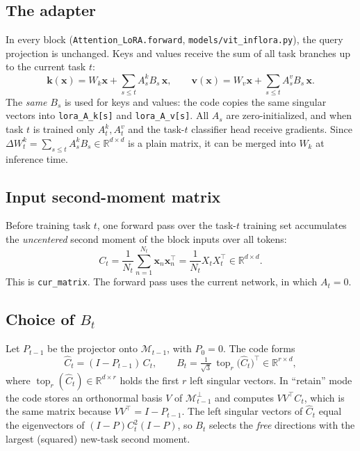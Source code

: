 \documentclass[11pt]{article}
\theoremstyle{plain}
\theoremstyle{definition}
\theoremstyle{remark}
\newcommand{\R}{\mathbb{R}}
\newcommand{\M}{\mathcal{M}}
\newcommand{\topr}{\operatorname{top}_r}
\newcommand{\x}{\bm{x}}
\newcommand{\code}[1]{\texttt{#1}}
\begin{document}
\subsection{The adapter}
In every block (\code{Attention\_LoRA.forward}, \code{models/vit\_inflora.py}), the query projection is unchanged. Keys and values receive the sum of all task branches up to the current task $t$:
\begin{equation}\label{eq:adapter}
\bm k(\x) = W_k\x + \sum_{s\le t} A^k_s B_s\,\x,\qquad
\bm v(\x) = W_v\x + \sum_{s\le t} A^v_s B_s\,\x .
\end{equation}
The \emph{same} $B_s$ is used for keys and values: the code copies the same singular vectors into \code{lora\_A\_k[s]} and \code{lora\_A\_v[s]}. All $A_s$ are zero-initialized, and when task $t$ is trained only $A^k_t, A^v_t$ and the task-$t$ classifier head receive gradients. Since $\Delta W^k_t=\sum_{s\le t}A^k_sB_s\in\R^{d\times d}$ is a plain matrix, it can be merged into $W_k$ at inference time.

\subsection{Input second-moment matrix}
Before training task $t$, one forward pass over the task-$t$ training set accumulates the \emph{uncentered} second moment of the block inputs over all tokens:
\begin{equation}\label{eq:secondmoment}
C_t = \frac{1}{N_t}\sum_{n=1}^{N_t}\x_n\x_n^{\top}= \frac{1}{N_t}X_tX_t^{\top}\in\R^{d\times d}.
\end{equation}
This is \code{cur\_matrix}. The forward pass uses the current network, in which $A_t=0$.

\subsection{Choice of $B_t$}
Let $P_{t-1}$ be the projector onto $\M_{t-1}$, with $P_0=0$. The code forms
\begin{equation}\label{eq:Bt}
\widehat C_t = (I-P_{t-1})\,C_t,\qquad
B_t = \tfrac{1}{\sqrt 3}\,\topr\big(\widehat C_t\big)^{\top}\in\R^{r\times d},
\end{equation}
where $\topr(\widehat C_t)\in\R^{d\times r}$ holds the first $r$ left singular vectors. In ``retain'' mode the code stores an orthonormal basis $V$ of $\M_{t-1}^{\perp}$ and computes $VV^{\top}C_t$, which is the same matrix because $VV^{\top}=I-P_{t-1}$. The left singular vectors of $\widehat C_t$ equal the eigenvectors of $(I-P)C_t^2(I-P)$, so $B_t$ selects the \emph{free} directions with the largest (squared) new-task second moment.
\end{document}
